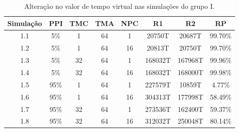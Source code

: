 \begin{table}
    \begin{center}
        \caption{Alteração no valor de tempo virtual nas simulações do grupo I.}
        \label{table:vtaltv1}
        \begin{tabular}{ |c|c|c|c|c|c|c|c| }
            \hline
            \textbf{Simulação} & \textbf{PPI} & \textbf{TMC} & \textbf{TMA} & \textbf{NPC} & \textbf{R1} & \textbf{R2} & \textbf{RP}\\
            \hline
            1.1 & 5\% & 1 & 64 & 1 & 20750T & 20687T & 99.70\%\\
            \hline
            1.2 & 5\% & 1 & 64 & 16 & 20813T & 20750T & 99.70\%\\
            \hline
            1.3 & 5\% & 32 & 64 & 1 & 168032T & 167968T & 99.96\%\\
            \hline
            1.4 & 5\% & 32 & 64 & 16 & 168032T & 168000T & 99.98\%\\
            \hline
            1.5 & 95\% & 1 & 64 & 1 & 227579T & 10859T & 4.77\%\\
            \hline
            1.6 & 95\% & 1 & 64 & 16 & 304313T & 177998T & 58.49\%\\
            \hline
            1.7 & 95\% & 32 & 64 & 1 & 273536T & 162400T & 59.37\%\\
            \hline
            1.8 & 95\% & 32 & 64 & 16 & 312032T & 250048T & 80.14\%\\
            \hline
            
        \end{tabular}{}
    \end{center}{}
\end{table}

